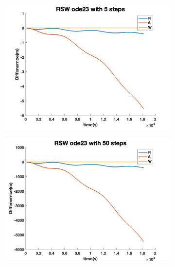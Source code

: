 \documentclass[12pt
,headinclude
,headsepline
,bibtotocnumbered
]{scrartcl}
\begin{document}
\begin{figure}[H]
    \centering
    \begin{subfigure}[b]{0.45\textwidth}
    \includegraphics[width=1\textwidth]{./plots/ode23_5_yprime_RSW.png}
    \end{subfigure}
    \begin{subfigure}[b]{0.45\textwidth}
    \includegraphics[width=1\textwidth]{./plots/ode23_50_yprime_RSW.png}
    \end{subfigure}
    \begin{subfigure}[b]{0.45\textwidth}

\end{subfigure}
\end{figure}
\end{document}
